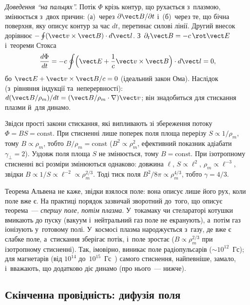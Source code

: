 \emph{Доведення \enquote{на пальцях}.} Потік $\Phi$ крізь контур, що рухається з~плазмою, змінюється з~двох причин:
(а)~через $\partial\vect B/\partial t$ і~(б)~через те, що бічна поверхня, яку описує контур за час $dt$, перетинає силові лінії.
Другий внесок дорівнює $-\oint(\vect v\times\vect B)\cdot d\vect l$. З~$\partial_t\vect B=-c\,\rot\vect E$ і~теореми Стокса
\[\frac{d\Phi}{dt}=-c\oint\Bigl(\vect E+\frac1c\vect v\times\vect B\Bigr)\cdot d\vect l=0,\]
бо $\vect E+\vect v\times\vect B/c=0$ (ідеальний закон Ома). Наслідок (з~рівняння індукції та~неперервності): $d(\vect B/\rho_m)/dt=(\vect B/\rho_m\cdot\nabla)\vect v$; він знадобиться для стискання плазми й~для динамо.

Звідси прості закони стискання, які випливають зі збереження потоку $\Phi=BS=\mathrm{const}$. При стисненні лише поперек поля площа
перерізу $S\propto1/\rho_m$, тому $B\propto\rho_m$, тобто $B/\rho_m=\mathrm{const}$ ($B^2\propto\rho_m^2$, ефективний показник адіабати $\gamma_\perp=2$).
Уздовж поля площа $S$ не змінюється, тому $B=\mathrm{const}$. При ізотропному стисненні всі розміри змінюються однаково: довжина $\ell$,
$S\propto\ell^2$, $\rho_m\propto\ell^{-3}$, звідки $B\propto1/S\propto\ell^{-2}\propto\rho_m^{2/3}$. Тоді тиск поля $B^2/8\pi\propto\rho_m^{4/3}$,
тобто $\gamma=4/3$.

Теорема Альвена не каже, звідки взялося поле: вона описує лише його рух, коли поле вже є. На практиці порядок зазвичай
зворотний до~того, що описує теорема~--- \emph{спершу поле, потім плазма}. У~токамаку чи стелараторі котушки вмикають до пуску (вакуум і~нейтральний газ поле не
екранують), а~потім газ іонізують у~готовому полі. У~космосі плазма народжується з~газу, де вже є слабке поле, а~стискання
зберігає потік, і~поле зростає ($B\propto\rho_m^{2/3}$ при ізотропному стисненні). Так, імовірно, виникає поле радіопульсарів
($\sim10^{12}$~Гс); для магнетарів (від $10^{14}$ до~$10^{15}$~Гс~\cite{kaspi2017magnetars}) самого стиснення, найпевніше, замало, і~вважають, що додатково діє динамо (про нього~--- нижче).


\subsection*{Скінченна провідність: дифузія поля}


